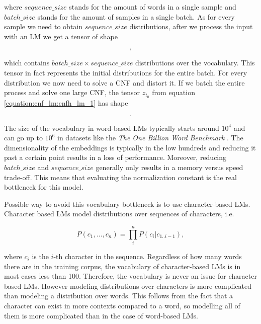 where $ sequence\_size $ stands for the amount of words in a single sample and $ batch\_size $ stands for the amount of samples in a single batch. As for every sample we need to obtain $ sequence\_size $ distributions, after we process the input with an LM we get a tensor of shape

\begin{displaymath}
    [batch\_size, \ sequence\_size, \ vocabulary\_size],
\end{displaymath}

which contains $ batch\_size \times sequence\_size $ distributions over the vocabulary. This tensor in fact represents the initial distributions for the entire batch. For every distribution we now need to solve a CNF and distort it. If we batch the entire process and solve one large CNF, the tensor $ z_{t_0} $ from equation \ref{equation:cnf_lm:cnfh_lm_1} has shape

\begin{displaymath}
    [batch\_size, \ sequence\_size, \ vocabulary\_size, \ embedding\_size].
\end{displaymath}

The size of the vocabulary in word-based LMs typically starts around $ 10^4 $ and can go up to $ 10^6 $ in datasets like the \emph{The One Billion Word Benchmark} \citep{chelba2013one}. The dimensionality of the embeddings is typically in the low hundreds and reducing it past a certain point results in a loss of performance. Moreover, reducing $ batch\_size $ and $ sequence\_size $ generally only results in a memory versus speed trade-off. This means that evaluating the normalization constant is the real bottleneck for this model.

Possible way to avoid this vocabulary bottleneck is to use character-based LMs. Character based LMs model distributions over sequences of characters, i.e.

\begin{displaymath}
    P(c_1, ..., c_n) = \prod_i^n P(c_i | c_{1..i-1}),
\end{displaymath}

where $ c_i $ is the $ i $-th character in the sequence. Regardless of how many words there are in the training corpus, the vocabulary of character-based LMs is in most cases less than 100. Therefore, the vocabulary is never an issue for character based LMs. However modeling distributions over characters is more complicated than modeling a distribution over words. This follows from the fact that a character can exist in more contexts compared to a word, so modelling all of them is more complicated than in the case of word-based LMs.

